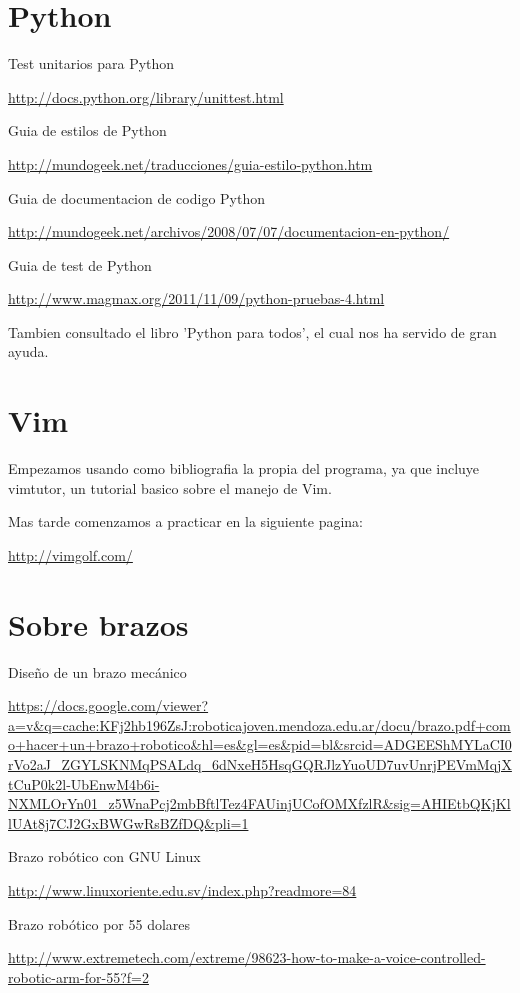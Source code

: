 \documentclass[12pt,a4paper]{report}
\begin{document}
\section{Python }
Test unitarios para Python

\url{http://docs.python.org/library/unittest.html}

Guia de estilos de Python

\url{http://mundogeek.net/traducciones/guia-estilo-python.htm}

Guia de documentacion de codigo Python

\url{http://mundogeek.net/archivos/2008/07/07/documentacion-en-python/}

Guia de test de Python

\url{http://www.magmax.org/2011/11/09/python-pruebas-4.html}

Tambien consultado el libro 'Python para todos', el cual nos ha servido de gran
ayuda.

\section{Vim}

Empezamos usando como bibliografia la propia del programa, ya que incluye
vimtutor, un tutorial basico sobre el manejo de Vim.

Mas tarde comenzamos a practicar en la siguiente pagina:

\url{http://vimgolf.com/}

\section{Sobre brazos}

Diseño de un brazo mecánico

\url{https://docs.google.com/viewer?a=v&q=cache:KFj2hb196ZsJ:roboticajoven.mendoza.edu.ar/docu/brazo.pdf+como+hacer+un+brazo+robotico&hl=es&gl=es&pid=bl&srcid=ADGEEShMYLaCI0rVo2aJ_ZGYLSKNMqPSALdq_6dNxeH5HsqGQRJlzYuoUD7uvUnrjPEVmMqjXtCuP0k2l-UbEnwM4b6i-NXMLOrYn01_z5WnaPcj2mbBftlTez4FAUinjUCofOMXfzlR&sig=AHIEtbQKjKllUAt8j7CJ2GxBWGwRsBZfDQ&pli=1}

Brazo robótico con GNU  Linux

\url{http://www.linuxoriente.edu.sv/index.php?readmore=84}

Brazo robótico por 55 dolares

\url{http://www.extremetech.com/extreme/98623-how-to-make-a-voice-controlled-robotic-arm-for-55?f=2}
\end{document}
